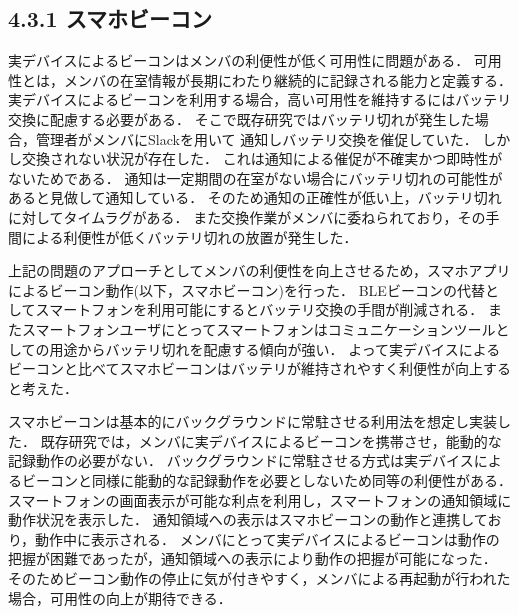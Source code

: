 


\subsection*{4.3.1 スマホビーコン}

実デバイスによるビーコンはメンバの利便性が低く可用性に問題がある．
可用性とは，メンバの在室情報が長期にわたり継続的に記録される能力と定義する．
実デバイスによるビーコンを利用する場合，高い可用性を維持するにはバッテリ交換に配慮する必要がある．
そこで既存研究ではバッテリ切れが発生した場合，管理者がメンバにSlackを用いて
通知しバッテリ交換を催促していた．
しかし交換されない状況が存在した．
これは通知による催促が不確実かつ即時性がないためである．
通知は一定期間の在室がない場合にバッテリ切れの可能性があると見做して通知している．
そのため通知の正確性が低い上，バッテリ切れに対してタイムラグがある．
また交換作業がメンバに委ねられており，その手間による利便性が低くバッテリ切れの放置が発生した．



上記の問題のアプローチとしてメンバの利便性を向上させるため，スマホアプリによるビーコン動作(以下，スマホビーコン)を行った．
BLEビーコンの代替としてスマートフォンを利用可能にするとバッテリ交換の手間が削減される．
またスマートフォンユーザにとってスマートフォンはコミュニケーションツールとしての用途からバッテリ切れを配慮する傾向が強い．
よって実デバイスによるビーコンと比べてスマホビーコンはバッテリが維持されやすく利便性が向上すると考えた．

スマホビーコンは基本的にバックグラウンドに常駐させる利用法を想定し実装した．
既存研究では，メンバに実デバイスによるビーコンを携帯させ，能動的な記録動作の必要がない．
バックグラウンドに常駐させる方式は実デバイスによるビーコンと同様に能動的な記録動作を必要としないため同等の利便性がある．
スマートフォンの画面表示が可能な利点を利用し，スマートフォンの通知領域に動作状況を表示した．
通知領域への表示はスマホビーコンの動作と連携しており，動作中に表示される．
メンバにとって実デバイスによるビーコンは動作の把握が困難であったが，通知領域への表示により動作の把握が可能になった．
そのためビーコン動作の停止に気が付きやすく，メンバによる再起動が行われた場合，可用性の向上が期待できる．